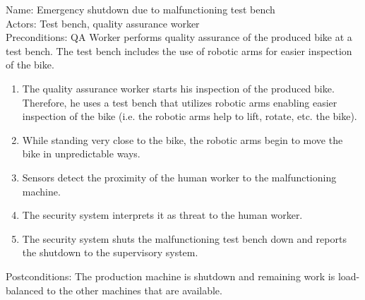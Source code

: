 \documentclass{article}
\begin{document}
Name: Emergency shutdown due to malfunctioning test bench \\
Actors: Test bench, quality assurance worker \\
Preconditions: QA Worker performs quality assurance of the produced bike at a test bench. The test bench includes the use of robotic arms for easier inspection of the bike.
\begin{enumerate}
    \item The quality assurance worker starts his inspection of the produced bike. Therefore, he uses a test bench that utilizes robotic arms enabling easier inspection of the bike (i.e. the robotic arms help to lift, rotate, etc. the bike).
    \item While standing very close to the bike, the robotic arms begin to move the bike in unpredictable ways.
    \item Sensors detect the proximity of the human worker to the malfunctioning machine.
    \item The security system interprets it as threat to the human worker.
    \item The security system shuts the malfunctioning test bench down and reports the shutdown to the supervisory system.
\\

\end{enumerate}

Postconditions: The production machine is shutdown and remaining work is load-balanced to the other machines that are available.
\end{document}
